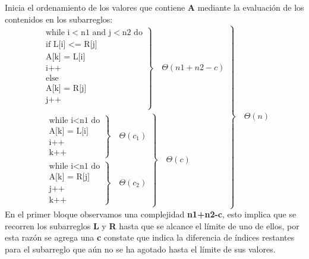     Inicia el ordenamiento de los valores que contiene \textbf{A} mediante la evaluación de los contenidos en los subarreglos:
    \begin{equation*}
        \left.
            \begin{aligned}
                \left.
                    \begin{aligned}
                        \text{while i}<\text{n1 and j}<\text{n2 do} \\
                        \text{if L[i] <= R[j]} \\
                        \text{A[k] = L[i]} \\
                        \text{i++} \\
                        \text{else} \\
                        \text{A[k] = R[j]} \\
                        \text{j++} \\
                    \end{aligned}
                \right\}
                \quad\Theta(n1+n2-c)
                \\
                \left.
                    \begin{aligned}
                        \left.
                            \begin{aligned}
                                \text{while i}<\text{n1 do}\\
                                \text{A[k] = L[i]}\\
                                \text{i++} \\
                                \text{k++}
                            \end{aligned}
                        \right\}
                        \quad \Theta(c_1)
                        \\
                        \left.
                            \begin{aligned}
                                \text{while i}<\text{n1 do}\\
                                \text{A[k] = R[j]}\\
                                \text{j++} \\
                                \text{k++}
                            \end{aligned}
                        \right\}
                        \quad \Theta(c_2)
                    \end{aligned}
                \right\}
                \quad\Theta(c)
            \end{aligned}
        \right\}
        \quad\Theta(n)
    \end{equation*}
    En el primer bloque observamos una complejidad \textbf{n1+n2-c}, esto implica que se recorren los subarreglos \textbf{L} y \textbf{R} hasta que se alcance el límite de uno de ellos, por esta razón se agrega una \textbf{c} constate que indica la diferencia de índices restantes para el subarreglo que aún no se ha agotado hasta el límite de sus valores.\\
    
